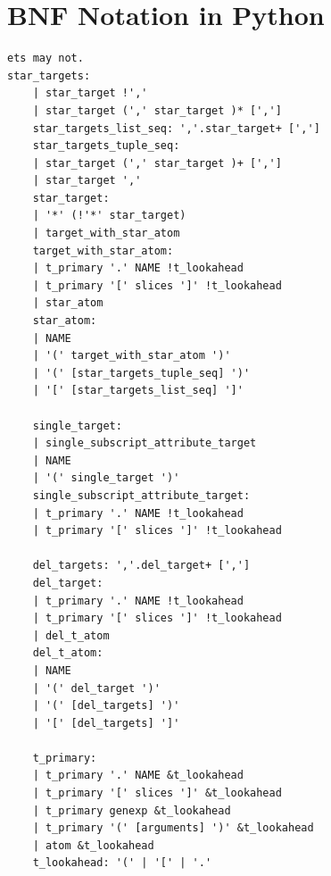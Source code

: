 \documentclass[
	12pt, %
]{fphw}
\begin{document}
\section*{{\color{Apricot}BNF Notation in Python}}

\begin{verbatim}
ets may not.
star_targets:
    | star_target !','
    | star_target (',' star_target )* [',']
    star_targets_list_seq: ','.star_target+ [',']
    star_targets_tuple_seq:
    | star_target (',' star_target )+ [',']
    | star_target ','
    star_target:
    | '*' (!'*' star_target)
    | target_with_star_atom
    target_with_star_atom:
    | t_primary '.' NAME !t_lookahead
    | t_primary '[' slices ']' !t_lookahead
    | star_atom
    star_atom:
    | NAME
    | '(' target_with_star_atom ')'
    | '(' [star_targets_tuple_seq] ')'
    | '[' [star_targets_list_seq] ']'

    single_target:
    | single_subscript_attribute_target
    | NAME
    | '(' single_target ')'
    single_subscript_attribute_target:
    | t_primary '.' NAME !t_lookahead
    | t_primary '[' slices ']' !t_lookahead

    del_targets: ','.del_target+ [',']
    del_target:
    | t_primary '.' NAME !t_lookahead
    | t_primary '[' slices ']' !t_lookahead
    | del_t_atom
    del_t_atom:
    | NAME
    | '(' del_target ')'
    | '(' [del_targets] ')'
    | '[' [del_targets] ']'

    t_primary:
    | t_primary '.' NAME &t_lookahead
    | t_primary '[' slices ']' &t_lookahead
    | t_primary genexp &t_lookahead
    | t_primary '(' [arguments] ')' &t_lookahead
    | atom &t_lookahead
    t_lookahead: '(' | '[' | '.'
  
\end{verbatim}
\end{document}
